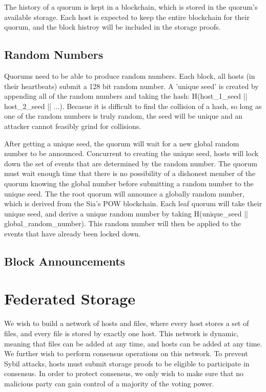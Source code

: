 \documentclass[twocolumn]{article}
\begin{document}
The history of a quorum is kept in a blockchain, which is stored in the quorum's available storage.
Each host is expected to keep the entire blockchain for their quorum, and the block histroy will be included in the storage proofs.

\subsection{Random Numbers}
Quorums need to be able to produce random numbers.
Each block, all hosts (in their heartbeats) submit a 128 bit random number.
A 'unique seed' is created by appending all of the random numbers and taking the hash: H(host\_1\_seed || host\_2\_seed || ...).
Becasue it is difficult to find the collision of a hash, so long as one of the random numbers is truly random, the seed will be unique and an attacker cannot feasibly grind for collisions.

After getting a unique seed, the quorum will wait for a new global random number to be announced.
Concurrent to creating the unique seed, hosts will lock down the set of events that are determined by the random number.
The quorum must wait enough time that there is no possibility of a dishonest member of the quorum knowing the global number before submitting a random number to the unique seed.
The the root quorum will announce a globally random number, which is derived from the Sia's POW blockchain.
Each leaf quorum will take their unique seed, and derive a unique random number by taking H(unique\_seed || global\_random\_number).
This random number will then be applied to the events that have already been locked down.

\subsection{Block Announcements}


\section{Federated Storage}
We wish to build a network of hosts and files, where every host stores a set of files, and every file is stored by exactly one host.
This network is dynamic, meaning that files can be added at any time, and hosts can be added at any time.
We further wish to perform consensus operations on this network.
To prevent Sybil attacks, hosts must submit storage proofs to be eligible to participate in consensus.
In order to protect consensus, we only wish to make sure that no malicious party can gain control of a majority of the voting power.
\end{document}
